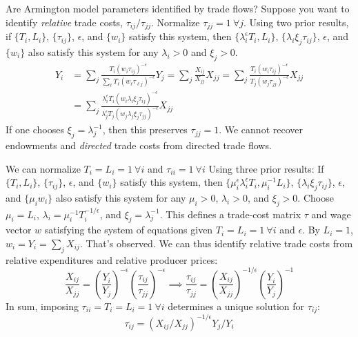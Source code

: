 \documentclass[11pt,notes=hide,aspectratio=169]{beamer}
\begin{document}
\begin{frame}{Are  Armington model parameters identified by trade flows?}
Suppose you want to identify \textit{relative} trade costs, $\tau_{ij} / \tau_{jj}$.
Normalize $\tau_{jj} = 1 \ \forall j$.
\medskip
Using two prior results,
if $\{T_i,L_i\}$, $\{\tau_{ij}\}$, $\epsilon$, and $\{w_i\}$ satisfy this system,
then
$\{\lambda_i^{\epsilon} T_i,L_i\}$, $\{\lambda_i \xi_j \tau_{ij}\}$, $\epsilon$, and $\{w_i\}$
also satisfy this system
for any $\lambda_{i} > 0$ and $\xi_j > 0$.
\begin{align*}
Y_i
&=
\sum_j \frac{T_i \left(w_i \tau_{ij}\right)^{-\epsilon}}{\sum_{\ell} T_{\ell} \left(w_{\ell} \tau_{\ell j}\right)^{-\epsilon}}
Y_j
=
\sum_j \frac{X_{ij}}{X_{jj}} 
X_{jj}
=
\sum_j \frac{T_i \left(w_i \tau_{ij}\right)^{-\epsilon}}{T_j \left(w_j \tau_{jj}\right)^{-\epsilon}}
X_{jj}
\\
&=
\sum_j \frac{\lambda_i^{\epsilon}T_i \left(w_i \lambda_i \xi_j\tau_{ij}\right)^{-\epsilon}}{\lambda_j^{\epsilon}T_j \left(w_j \lambda_j \xi_j \tau_{jj}\right)^{-\epsilon}}
X_{jj}
\end{align*}
If one chooses $\xi_j = \lambda^{-1}_j$, then this preserves $\tau_{jj} = 1$.
\medskip
We cannot recover endowments and \textit{directed} trade costs from directed trade flows.
\end{frame}
\begin{frame}{We can normalize $T_i = L_i = 1 \ \forall i$ and $\tau_{ii} = 1 \ \forall i$}
Using three prior results:
If $\{T_i,L_i\}$, $\{\tau_{ij}\}$, $\epsilon$, and $\{w_i\}$ satisfy this system,
then
$\{\mu_{i}^{\epsilon}\lambda_i^{\epsilon} T_i,\mu_{i}^{-1} L_i\}$, $\{\lambda_i \xi_j \tau_{ij}\}$, $\epsilon$, and $\{\mu_{i}w_i\}$
also satisfy this system
for any $\mu_{i} > 0$, $\lambda_{i} > 0$, and $\xi_j > 0$.
\medskip
Choose
$\mu_{i} =  L_i$,
$\lambda_{i}  = \mu_{i}^{-1} T_i^{-1/\epsilon}$,
and
$\xi_j = \lambda^{-1}_j$.
This defines a trade-cost matrix $\tau$ and wage vector $w$ satisfying the system of equations 
given $T_i = L_i = 1 \ \forall i$ and $\epsilon$.
\medskip
By $L_i = 1$, $w_i = Y_i = \sum_{j} X_{ij}$.
That's observed.
We can thus identify relative trade costs from relative expenditures and relative producer prices:
$$
\frac{X_{ij}}{X_{jj}} = \left(\frac{Y_i}{Y_j}\right)^{-\epsilon} \left(\frac{\tau_{ij}}{\tau_{jj}}\right)^{-\epsilon}
\implies
\frac{\tau_{ij}}{\tau_{jj}} = \left(\frac{X_{ij}}{X_{jj}}\right)^{-1/\epsilon}\left(\frac{Y_i}{Y_j}\right)^{-1}
$$
\smallskip
In sum, imposing $\tau_{ii} = T_i = L_i = 1 \ \forall i$ determines a unique solution for $\tau_{ij}$:
$$
\tau_{ij} = \left(X_{ij} / X_{jj}\right)^{-1/\epsilon} Y_j / Y_i
$$
\end{frame}
\end{document}
